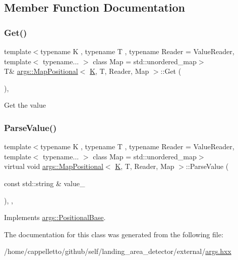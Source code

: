 \subsection{Member Function Documentation}
\mbox{\label{classargs_1_1_map_positional_a46e4f230ddbca26b7eb849fd3d87510d}} 
\subsubsection{\texorpdfstring{Get()}{Get()}}
{\footnotesize\ttfamily template$<$typename K , typename T , typename Reader  = Value\+Reader, template$<$ typename... $>$ class Map = std\+::unordered\+\_\+map$>$ \\
T\& \hyperlink{classargs_1_1_map_positional}{args\+::\+Map\+Positional}$<$ \hyperlink{cgal__test_8cpp_a891e241aa245ae63618f03737efba309}{K}, T, Reader, Map $>$\+::Get (\begin{DoxyParamCaption}{ }\end{DoxyParamCaption})\hspace{0.3cm}{\ttfamily [inline]}, {\ttfamily [noexcept]}}

Get the value \mbox{\label{classargs_1_1_map_positional_a8ac67b0ee5008bd6c9a39974c2a40ee4}} 
\subsubsection{\texorpdfstring{Parse\+Value()}{ParseValue()}}
{\footnotesize\ttfamily template$<$typename K , typename T , typename Reader  = Value\+Reader, template$<$ typename... $>$ class Map = std\+::unordered\+\_\+map$>$ \\
virtual void \hyperlink{classargs_1_1_map_positional}{args\+::\+Map\+Positional}$<$ \hyperlink{cgal__test_8cpp_a891e241aa245ae63618f03737efba309}{K}, T, Reader, Map $>$\+::Parse\+Value (\begin{DoxyParamCaption}\item[{const std\+::string \&}]{value\+\_\+ }\end{DoxyParamCaption})\hspace{0.3cm}{\ttfamily [inline]}, {\ttfamily [override]}, {\ttfamily [virtual]}}



Implements \hyperlink{classargs_1_1_positional_base_a10b6b91155f56bc28ca25fa87c6f0985}{args\+::\+Positional\+Base}.



The documentation for this class was generated from the following file\+:\begin{DoxyCompactItemize}
\item 
/home/cappelletto/github/self/landing\+\_\+area\+\_\+detector/external/\hyperlink{args_8hxx}{args.\+hxx}\end{DoxyCompactItemize}
